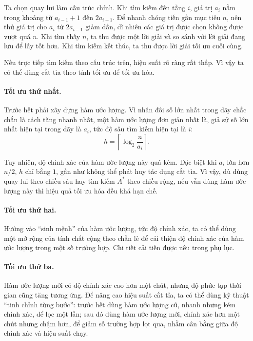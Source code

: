 \documentclass[11pt]{article}
\begin{document}
Ta chọn quay lui làm cấu trúc chính. Khi tìm kiếm đến tầng \(i\), giá trị
\(a_i\) nằm trong khoảng từ \(a_{i-1}+1\) đến \(2a_{i-1}\). Để nhanh chóng
tiến gần mục tiêu \(n\), nên thử giá trị cho \(a_i\) từ \(2a_{i-1}\) giảm
dần, dĩ nhiên các giá trị được chọn không được vượt quá \(n\). Khi tìm thấy
\(n\), ta thu được một lời giải và so sánh với lời giải đang lưu để lấy tốt
hơn. Khi tìm kiếm kết thúc, ta thu được lời giải tối ưu cuối cùng.

Nếu trực tiếp tìm kiếm theo cấu trúc trên, hiệu suất rõ ràng rất thấp. Vì vậy
ta có thể dùng cắt tỉa theo tính tối ưu để tối ưu hóa.

\paragraph{Tối ưu thứ nhất.}
Trước hết phải xây dựng hàm ước lượng. Vì nhân đôi số lớn nhất trong dãy chắc
chắn là cách tăng nhanh nhất, một hàm ước lượng đơn giản nhất là, giả sử số
lớn nhất hiện tại trong dãy là \(a_i\), tức độ sâu tìm kiếm hiện tại là \(i\):
\[
  h=\left\lceil \log_2 \frac{n}{a_i}\right\rceil .
\]

Tuy nhiên, độ chính xác của hàm ước lượng này quá kém. Đặc biệt khi \(a_i\)
lớn hơn \(n/2\), \(h\) chỉ bằng \(1\), gần như không thể phát huy tác dụng cắt
tỉa. Vì vậy, dù dùng quay lui theo chiều sâu hay tìm kiếm \(A^\ast\) theo
chiều rộng, nếu vẫn dùng hàm ước lượng này thì hiệu quả tối ưu hóa đều khá
hạn chế.

\paragraph{Tối ưu thứ hai.}
Hướng vào ``sinh mệnh'' của hàm ước lượng, tức độ chính xác, ta có thể dùng
một mở rộng của tính chất cộng theo chẵn lẻ để cải thiện độ chính xác của hàm
ước lượng trong một số trường hợp. Chi tiết cải tiến được nêu trong phụ lục.

\paragraph{Tối ưu thứ ba.}
Hàm ước lượng mới có độ chính xác cao hơn một chút, nhưng độ phức tạp thời
gian cũng tăng tương ứng. Để nâng cao hiệu suất cắt tỉa, ta có thể dùng kỹ
thuật ``tinh chỉnh từng bước'': trước hết dùng hàm ước lượng cũ, nhanh nhưng
kém chính xác, để lọc một lần; sau đó dùng hàm ước lượng mới, chính xác hơn
một chút nhưng chậm hơn, để giảm số trường hợp lọt qua, nhằm cân bằng giữa độ
chính xác và hiệu suất chạy.
\end{document}

